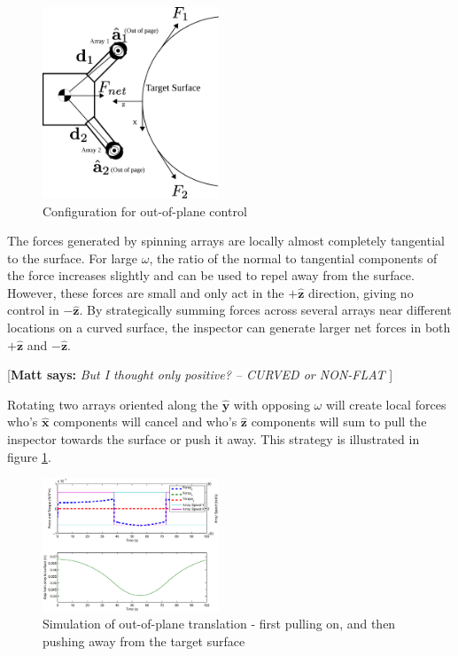 \documentclass[letterpaper, 10 pt, conference]{ieeeconf}  %
\newcommand{\matt}[1]{{\color{darkgreen}\small\par {[{\bf Matt says:} {\em #1}} ] \\    }}
\begin{document}
  \begin{figure}[thpb]
      \centering
      \includegraphics[width = 0.47\textwidth]{figures/curve_locomotion.eps}
      \caption{Configuration for out-of-plane control}
      \label{fig:outofplaneschematic}
   \end{figure}
The forces generated by spinning arrays are locally almost completely tangential to the surface. For large $\omega$, the ratio of the normal to tangential components of the force increases slightly and can be used to repel away from the surface. However, these forces are small and only act in the $+\hat{\textbf{z}}$ direction, giving no control in $-\hat{\textbf{z}}$. By strategically summing forces across several arrays near different locations on a curved surface, the inspector can generate larger net forces in both $+\hat{\textbf{z}}$ and $-\hat{\textbf{z}}$. \matt{But I thought only positive? -- CURVED or NON-FLAT} Rotating two arrays oriented along the $\hat{\textbf{y}}$ with opposing $\omega$ will create local forces who's $\hat{\textbf{x}}$ components will cancel and who's $\hat{\textbf{z}}$ components will sum to pull the inspector towards the surface or push it away. This strategy is illustrated in figure \ref{fig:outofplaneschematic}.     

 
   
     \begin{figure}[thpb]
      \centering
      \includegraphics[width = 0.47\textwidth]{figures/curve_translations.eps}
      \caption{Simulation of out-of-plane translation - first pulling on, and then pushing away from the target surface}
      \label{fig:ooptranslation}
   \end{figure}
\end{document}
